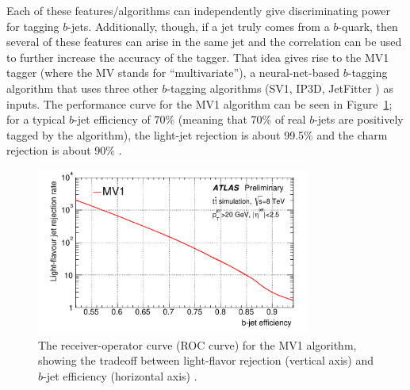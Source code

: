 Each of these features/algorithms can independently give discriminating power for tagging $b$-jets.
Additionally, though, if a jet truly comes from a $b$-quark, then several of these features can arise in the 
same jet and the correlation can be used to further increase the accuracy of the tagger.  That idea gives 
rise to the MV1 tagger (where the MV stands for ``multivariate''), a neural-net-based 
$b$-tagging algorithm that uses three other $b$-tagging algorithms (SV1, IP3D, JetFitter
) as inputs.   The performance curve for the MV1 algorithm can be seen in Figure~\ref{fig:mv1_roc}; 
for a typical $b$-jet efficiency of 70\% (meaning that 70\% of real $b$-jets 
are positively tagged by the algorithm), the light-jet rejection is about 99.5\% and the 
charm rejection is about 90\% \cite{b-tagging}.


\begin{figure}
	\includegraphics[width=0.8\textwidth]{ReconstructionPerformance/images/mv1_roc.pdf}
	\caption{The receiver-operator curve (ROC curve) for the MV1 algorithm, showing the tradeoff
    between light-flavor rejection (vertical axis) and $b$-jet efficiency (horizontal axis)
     \cite{b-tagging}.	\label{fig:mv1_roc}  }
\end{figure}
















